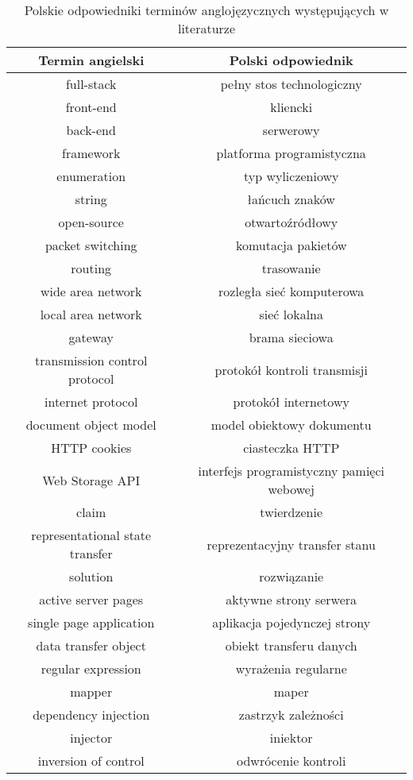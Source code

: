 \begin{table}[]
    \centering
    \caption{Polskie odpowiedniki terminów anglojęzycznych występujących w literaturze}
    \begin{tabular}{|c|c|}
        \hline
        \textbf{Termin angielski} & \textbf{Polski odpowiednik} \\
        \hline
        full-stack & pełny stos technologiczny \\
        \hline
        front-end & kliencki \\
        \hline
        back-end & serwerowy \\
        \hline
        framework & platforma programistyczna \\
        \hline
        enumeration & typ wyliczeniowy \\
        \hline
        string & łańcuch znaków \\
        \hline
        open-source & otwartoźródłowy \\
        \hline
        packet switching & komutacja pakietów \\
        \hline
        routing & trasowanie \\
        \hline
        wide area network & rozległa sieć komputerowa \\
        \hline
        local area network & sieć lokalna \\
        \hline
        gateway & brama sieciowa \\
        \hline
        transmission control protocol & protokół kontroli transmisji \\
        \hline
        internet protocol & protokół internetowy \\
        \hline
        document object model & model obiektowy dokumentu \\
        \hline
        HTTP cookies & ciasteczka HTTP \\
        \hline
        Web Storage API & interfejs programistyczny pamięci webowej \\
        \hline
        claim & twierdzenie \\
        \hline
        representational state transfer & reprezentacyjny transfer stanu \\
        \hline
        solution & rozwiązanie \\
        \hline
        active server pages & aktywne strony serwera \\
        \hline
        single page application & aplikacja pojedynczej strony \\
        \hline
        data transfer object & obiekt transferu danych \\
        \hline
        regular expression & wyrażenia regularne \\
        \hline
        mapper & maper \\
        \hline
        dependency injection & zastrzyk zależności \\
        \hline
        injector & iniektor \\
        \hline
        inversion of control & odwrócenie kontroli \\
        \hline
    \end{tabular}
    \label{tab:translation}
\end{table}